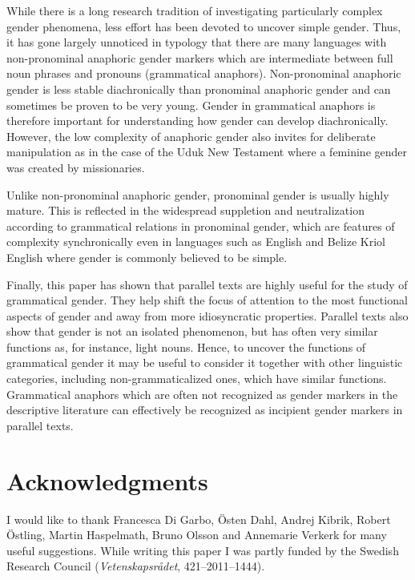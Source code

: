 \documentclass[output=collectionpaper]{langsci/langscibook}
\begin{document}
While there is a long research tradition of investigating particularly complex gender phenomena, less effort has been devoted to uncover simple gender. Thus, it has gone largely unnoticed in typology that there are many languages with non-pronominal anaphoric gender markers which are intermediate between full noun phrases and pronouns (grammatical anaphors). Non-pronominal anaphoric gender is less stable diachronically than pronominal anaphoric gender and can sometimes be proven to be very young. Gender in grammatical anaphors is therefore important for understanding how gender can develop diachronically. However, the low complexity of anaphoric gender also invites for deliberate manipulation as in the case of the Uduk New Testament where a feminine gender was created by missionaries.

Unlike non-pronominal anaphoric gender, pronominal gender is usually highly mature. This is reflected in the widespread suppletion and neutralization according to grammatical relations in pronominal gender, which are features of complexity synchronically even in languages such as English and Belize Kriol English where gender is commonly believed to be simple.

Finally, this paper has shown that parallel texts are highly useful for the study of grammatical gender. They help shift the focus of attention to the most functional aspects of gender and away from more idiosyncratic properties. Parallel texts also show that gender is not an isolated phenomenon, but has often very similar functions as, for instance, light nouns. Hence, to uncover the functions of grammatical gender it may be useful to consider it together with other linguistic categories, including non-grammaticalized ones, which have similar functions. Grammatical anaphors which are often not recognized as gender markers in the descriptive literature can effectively be recognized as incipient gender markers in parallel texts.

\section*{Acknowledgments}

I would like to thank Francesca Di Garbo, Östen Dahl, Andrej Kibrik, Robert Östling, Martin Haspelmath, Bruno Olsson and Annemarie Verkerk for many useful suggestions. While writing this paper I was partly funded by the Swedish Research Council (\textit{Vetenskapsrådet}, 421--2011--1444).
\end{document}
